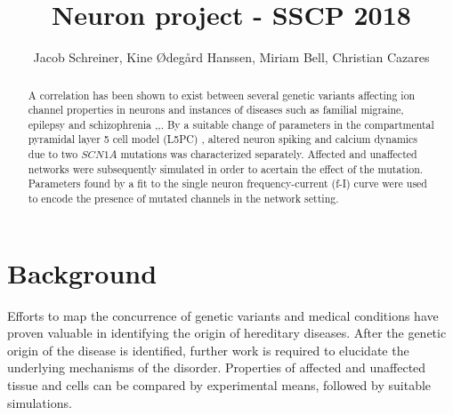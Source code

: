 \documentclass[twocolumn, a4paper,10pt, norsk]{scrartcl}
\title{Neuron project - SSCP 2018} %
\author{Jacob Schreiner, Kine Ødegård Hanssen, Miriam Bell, Christian Cazares}
\date{}
\begin{document}
\maketitle

\begin{abstract} %
 A correlation has been shown to exist between several genetic variants affecting ion channel properties in neurons and instances of diseases such as familial migraine, epilepsy and schizophrenia \cite{fhm},\cite{epilepsy},\cite{gautes}. By a suitable change of parameters in the compartmental pyramidal layer 5 cell model (L5PC) \cite{l5pc_model}, altered neuron spiking and calcium dynamics due to two $SCN1A$ mutations was characterized separately. Affected and unaffected networks were subsequently simulated in order to acertain the effect of the mutation. Parameters found by a fit to the single neuron frequency-current (f-I) curve were used to encode the presence of mutated channels in the network setting. %
\end{abstract}

\section*{Background}


Efforts to map the concurrence of genetic variants and medical conditions have proven valuable in identifying the origin of hereditary diseases. After the genetic origin of the disease is identified, further work is required to elucidate the underlying mechanisms of the disorder. Properties of affected and unaffected tissue and cells can be compared by experimental means, followed by suitable simulations.


\end{document}
